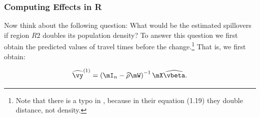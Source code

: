 \documentclass[english,12pt]{book}\usepackage[]{graphicx}\usepackage[]{xcolor}
\begin{document}
\subsubsection{Computing Effects in R}

Now think about the following question: What would be the estimated spillovers if region $R2$ doubles its population density? To answer this question we first obtain the predicted values of travel times before the change.\footnote{Note that there is a typo in \cite{lesage2010introduction}, because in their equation (1.19) they double distance, not density.} That is, we first obtain:

\begin{equation*}
\widehat{\vy}^{(1)} = \left(\mI_n - \widehat{\rho}\mW\right)^{-1}\mX\widehat{\vbeta}.
\end{equation*}
\end{document}
